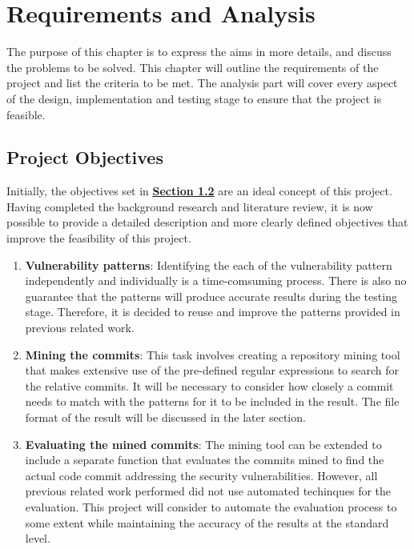 \documentclass[12pt, a4paper]{report}
\begin{document}
{\chapter{Requirements and Analysis}
The purpose of this chapter is to express the aims in more details, and discuss the problems to be
solved. This chapter will outline the requirements of the project and list the criteria to be met.
The analysis part will cover every aspect of the design, implementation and testing stage to ensure
that the project is feasible.

\section{Project Objectives}
Initially, the objectives set in \hyperref[sec:objectives]{\textbf{Section 1.2}} are an ideal
concept of this project. Having completed the background research and literature review, it is now
possible to provide a detailed description and more clearly defined objectives that improve the
feasibility of this project.

\begin{enumerate}
	\item \textbf{Vulnerability patterns}: Identifying the each of the vulnerability pattern
	independently and individually is a time-comsuming process. There is also no guarantee that the
	patterns will produce accurate results during the testing stage. Therefore, it is decided to reuse
	and improve the patterns provided in previous related work.
	\item \textbf{Mining the commits}: This task involves creating a repository mining tool that makes
	extensive use of the pre-defined regular expressions to search for the relative commits. It will
	be necessary to consider how closely a commit needs to match with the patterns for it to be
	included in the result. The file format of the result will be discussed in the later section.
	\item \textbf{Evaluating the mined commits}: The mining tool can be extended to include a separate
	function that evaluates the commits mined to find the actual code commit addressing the security
	vulnerabilities. However, all previous related work performed did not use automated techinques for
	the evaluation. This project will consider to automate the evaluation process to some extent while
	maintaining the accuracy of the results at the standard level.
\end{enumerate}

}
\end{document}
